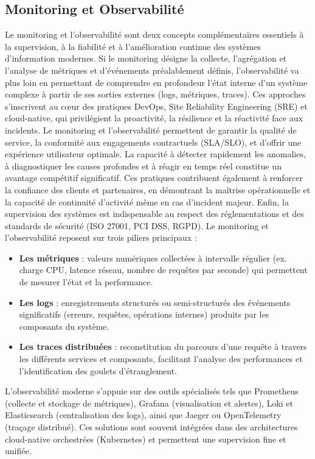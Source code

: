 \subsection{Monitoring et Observabilité}

Le monitoring et l’observabilité sont deux concepts complémentaires essentiels à la supervision, à la fiabilité et à l’amélioration continue des systèmes d’information modernes. Si le monitoring désigne la collecte, l’agrégation et l’analyse de métriques et d’événements préalablement définis, l’observabilité va plus loin en permettant de comprendre en profondeur l’état interne d’un système complexe à partir de ses sorties externes (logs, métriques, traces). Ces approches s’inscrivent au cœur des pratiques DevOps, Site Reliability Engineering (SRE) et cloud-native, qui privilégient la proactivité, la résilience et la réactivité face aux incidents.
Le monitoring et l’observabilité permettent de garantir la qualité de service, la conformité aux engagements contractuels (SLA/SLO), et d’offrir une expérience utilisateur optimale. La capacité à détecter rapidement les anomalies, à diagnostiquer les causes profondes et à réagir en temps réel constitue un avantage compétitif significatif. Ces pratiques contribuent également à renforcer la confiance des clients et partenaires, en démontrant la maîtrise opérationnelle et la capacité de continuité d’activité même en cas d’incident majeur. Enfin, la supervision des systèmes est indispensable au respect des réglementations et des standards de sécurité (ISO 27001, PCI DSS, RGPD).
Le monitoring et l’observabilité reposent sur trois piliers principaux :
\begin{itemize}
	\item \textbf{Les métriques} : valeurs numériques collectées à intervalle régulier (ex. charge CPU, latence réseau, nombre de requêtes par seconde) qui permettent de mesurer l’état et la performance.
	\item \textbf{Les logs} : enregistrements structurés ou semi-structurés des événements significatifs (erreurs, requêtes, opérations internes) produits par les composants du système.
	\item \textbf{Les traces distribuées} : reconstitution du parcours d’une requête à travers les différents services et composants, facilitant l’analyse des performances et l’identification des goulets d’étranglement.
\end{itemize}

L’observabilité moderne s’appuie sur des outils spécialisés tels que Prometheus (collecte et stockage de métriques), Grafana (visualisation et alertes), Loki et Elasticsearch (centralisation des logs), ainsi que Jaeger ou OpenTelemetry (traçage distribué). Ces solutions sont souvent intégrées dans des architectures cloud-native orchestrées (Kubernetes) et permettent une supervision fine et unifiée.

